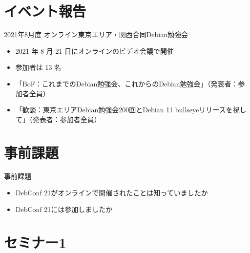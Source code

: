 \section{イベント報告}

\begin{frame}{2021年8月度 オンライン東京エリア・関西合同Debian勉強会}
\begin{itemize}
\item 2021 年 8 月 21 日にオンラインのビデオ会議で開催
\item 参加者は 13 名
\item 「BoF：これまでのDebian勉強会、これからのDebian勉強会」（発表者：参加者全員）
\item 「歓談：東京エリアDebian勉強会200回とDebian 11 bullseyeリリースを祝して」（発表者：参加者全員）
\end{itemize}
\end{frame}

\section{事前課題}

\begin{frame}{事前課題}
  \begin{itemize}
  \item DebConf 21がオンラインで開催されたことは知っていましたか
  \item DebConf 21には参加しましたか
  \end{itemize}
\end{frame}

{\footnotesize
  
}

%

\section{セミナー1}



